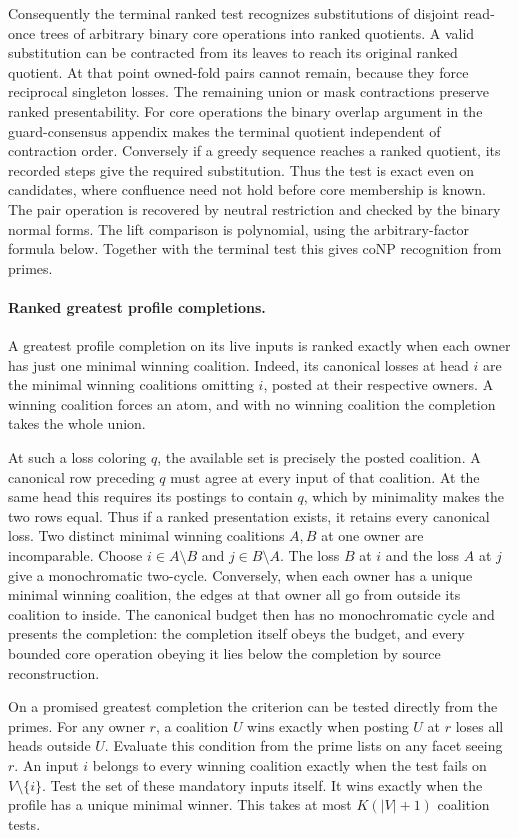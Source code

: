Consequently the terminal ranked test recognizes
substitutions of disjoint read-once trees of arbitrary
binary core operations into ranked quotients. A
valid substitution can be contracted from its leaves
to reach its original ranked quotient. At that point
owned-fold pairs cannot remain, because they force
reciprocal singleton losses. The remaining union or
mask contractions preserve ranked presentability.
For core operations the binary overlap argument in
the guard-consensus appendix makes the terminal
quotient independent of contraction order. Conversely
if a greedy sequence reaches a ranked quotient, its
recorded steps give the required substitution. Thus
the test is exact even on candidates, where confluence
need not hold before core membership is known.
The pair operation is recovered by neutral restriction
and checked by the binary normal forms. The lift
comparison is polynomial, using the arbitrary-factor
formula below. Together with the terminal test this
gives coNP recognition from primes.

\paragraph{Ranked greatest profile completions.}
A greatest profile completion on its live inputs is ranked exactly
when each owner has just one minimal winning coalition. Indeed, its
canonical losses at head $i$ are the minimal winning coalitions
omitting $i$, posted at their respective owners. A winning coalition
forces an atom, and with no winning coalition the completion takes
the whole union.

At such a loss coloring $q$, the available set is precisely the
posted coalition. A canonical row preceding $q$ must agree at every
input of that coalition. At the same head this requires its postings
to contain $q$, which by minimality makes the two rows equal. Thus
if a ranked presentation exists, it retains every canonical loss.
Two distinct minimal winning coalitions $A,B$ at one owner are
incomparable. Choose $i\in A\setminus B$ and $j\in B\setminus A$.
The loss $B$ at $i$ and the loss $A$ at $j$ give a monochromatic
two-cycle. Conversely, when each owner has a unique minimal winning
coalition, the edges at that owner all go from outside its coalition
to inside. The canonical budget then has no monochromatic cycle
and presents the completion: the completion itself obeys the
budget, and every bounded core operation obeying it lies below the
completion by source reconstruction.

On a promised greatest completion the criterion can be tested
directly from the primes. For any owner $r$, a coalition $U$ wins
exactly when posting $U$ at $r$ loses all heads outside $U$.
Evaluate this condition from the prime lists on any facet seeing
$r$. An input $i$ belongs to every winning coalition exactly
when the test fails on $V\setminus\{i\}$. Test the set of these
mandatory inputs itself. It wins exactly when the profile has
a unique minimal winner. This takes at most $K(|V|+1)$ coalition
tests.


